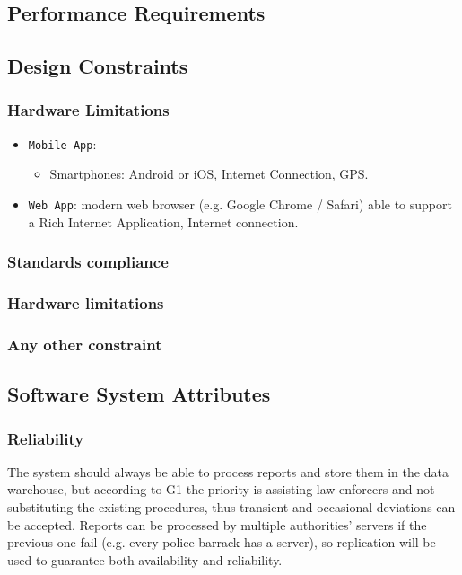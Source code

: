 \documentclass[12pt,a4paper]{article}
\begin{document}
\subsection{Performance	Requirements} 
\subsection{Design	Constraints}
\subsubsection{Hardware Limitations}
		\begin{itemize}
			\item \texttt{Mobile App}: 
				\begin{itemize}
					\item Smartphones: Android or iOS, Internet Connection, GPS.
				\end{itemize}
			\item \texttt{Web App}: modern web browser (e.g. Google Chrome / Safari) able to support a Rich Internet Application, Internet connection.
		\end{itemize}
\subsubsection{Standards	compliance}
\subsubsection{Hardware	limitations}
\subsubsection{Any	other	constraint} 
\subsection{Software	System	Attributes} 
\subsubsection{Reliability}
The system should always be able to process reports and store them in the data warehouse, but according to G1 the priority is assisting law enforcers and not substituting the existing procedures, thus transient and occasional deviations can be accepted.  Reports can be processed by multiple authorities' servers if the previous one fail (e.g. every police barrack has a server), so replication will be used to guarantee both availability and reliability.
\end{document}
